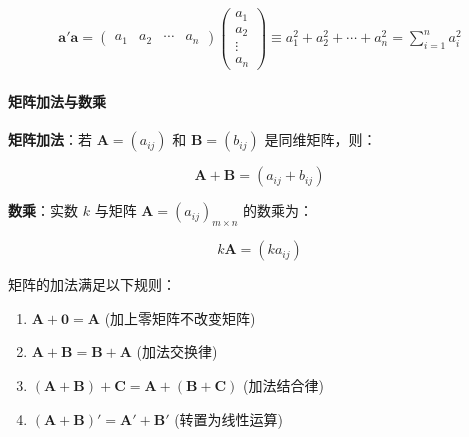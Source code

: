 \begin{equation}
	\begin{aligned}
		\mathbf{a'a} = \begin{pmatrix} a_1 & a_2 & \cdots & a_n \end{pmatrix}
		\begin{pmatrix}
			a_1 \\
			a_2 \\
			\vdots \\
			a_n
		\end{pmatrix}
		\equiv a_1^2 + a_2^2 + \cdots + a_n^2 = \sum_{i=1}^{n} a_i^2
	\end{aligned}
\end{equation}

\paragraph*{矩阵加法与数乘}
\begin{flushleft}
	\textbf{矩阵加法}：若 \( \mathbf{A} = (a_{ij}) \) 和 \( \mathbf{B} = (b_{ij}) \) 是同维矩阵，则：
\end{flushleft}

\begin{equation}
\mathbf{A} + \mathbf{B} = (a_{ij} + b_{ij})
\end{equation}
\begin{flushleft}
	\textbf{数乘}：实数 \( k \) 与矩阵 \( \mathbf{A} = (a_{ij})_{m \times n} \) 的数乘为：
\end{flushleft}

\begin{equation}
k\mathbf{A} = (k a_{ij})
\end{equation}

\begin{flushleft}
	矩阵的加法满足以下规则：
\end{flushleft}

\begin{enumerate}
	\item $\mathbf{A} + \mathbf{0} = \mathbf{A}$ \hfill (加上零矩阵不改变矩阵)
	\item $\mathbf{A} + \mathbf{B} = \mathbf{B} + \mathbf{A}$ \hfill (加法交换律)
	\item $(\mathbf{A} + \mathbf{B}) + \mathbf{C} = \mathbf{A} + (\mathbf{B} + \mathbf{C})$ \hfill (加法结合律)
	\item $(\mathbf{A} + \mathbf{B})' = \mathbf{A}' + \mathbf{B}'$ \hfill (转置为线性运算)
\end{enumerate}

